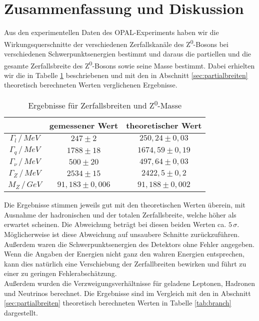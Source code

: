 \section{Zusammenfassung und Diskussion}

Aus den experimentellen Daten des OPAL-Experiments haben wir die Wirkungsquerschnitte der verschiedenen Zerfallskanäle des Z\textsuperscript0-Bosons bei verschiedenen Schwerpunktsenergien bestimmt und daraus die partiellen und die gesamte Zerfallsbreite des Z\textsuperscript0-Bosons sowie seine Masse bestimmt. Dabei erhielten wir die in Tabelle \ref{tab:ergebnisse} beschriebenen und mit den in Abschnitt \ref{sec:partialbreiten} theoretisch berechneten Werten verglichenen Ergebnisse.\\

\begin{table}[bh]
	\centering
	\begin{tabular}{c|cc}
		&gemessener Wert&theoretischer Wert\\\hline
		$\Gamma_l\,/\,\si{MeV}$&$247\pm2$&$250,24\pm0,03$\\
		$\Gamma_q\,/\,\si{MeV}$&$1788\pm18$&$1674,59\pm0,19$\\
		$\Gamma_\nu\,/\,\si{MeV}$&$500\pm20$&$497,64\pm0,03$\\
		$\Gamma_Z\,/\,\si{MeV}$&$2534\pm15$&$2422,5\pm0,2$\\
		$M_Z\,/\,\si{GeV}$&$91,183\pm0,006$&$91,188\pm0,002$
	\end{tabular}
	\caption{Ergebnisse für Zerfallsbreiten und Z\textsuperscript0-Masse}
	\label{tab:ergebnisse}
\end{table}

Die Ergebnisse stimmen jeweils gut mit den theoretischen Werten überein, mit Ausnahme der hadronischen und der totalen Zerfallsbreite, welche höher als erwartet scheinen. Die Abweichung beträgt bei diesen beiden Werten ca. $5\,\sigma$. Möglicherweise ist diese Abweichung auf unsaubere Schnitte zurückzuführen. Außerdem waren die Schwerpunktsenergien des Detektors ohne Fehler angegeben. Wenn die Angaben der Energien nicht ganz den wahren Energien entsprechen, kann dies natürlich eine Verschiebung der Zerfallbreiten bewirken und führt zu einer zu geringen Fehlerabschätzung.\\

Außerdem wurden die Verzweigungsverhältnisse für geladene Leptonen, Hadronen und Neutrinos berechnet. Die Ergebnisse sind im Vergleich mit den in Abschnitt \ref{sec:partialbreiten} theoretisch berechneten Werten in Tabelle \ref{tab:branch} dargestellt.\\

